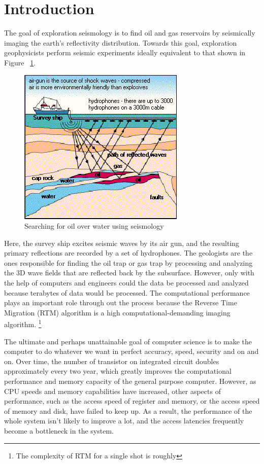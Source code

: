 
\section{Introduction}

The goal of exploration seismology is to find oil and gas reservoirs
by seismically imaging the earth's reflectivity distribution. Towards
this goal, exploration geophysicists perform seismic experiments ideally
equivalent to that shown in Figure ~\ref{fig:oil-drilling}.

\begin{figure}[h]
\centering
\includegraphics[scale=0.65]{img/oil-drilling-prospecting2.jpg}
\caption{Searching for oil over water using seismology}
\label{fig:oil-drilling}
\end{figure}

Here,
the survey ship excites seismic waves by its air gun, and the resulting
primary reflections are recorded by a set of hydrophones. The geologists
are the ones responsible for finding the oil trap or gas trap by processing
and analyzing the 3D wave fields that are reflected back by the subsurface.
However, only with the help of computers and engineers could the data
be processed and analyzed because terabytes of data would be processed.
The computational performance plays an important role through out
the process because the Reverse Time Migration (RTM) algorithm is
a high computational-demanding imaging algorithm.%
\footnote{The complexity of RTM for a single shot is roughly %
}



The ultimate and perhaps unattainable goal of computer science is
to make the computer to do whatever we want in perfect accuracy, speed,
security and on and on. Over time, the number of transistor on integrated
circuit doubles approximately every two year, which greatly improves
the computational performance and memory capacity of the general purpose
computer. However, as CPU speeds and memory capabilities have increased,
other aspects of performance, such as the access speed of register
and memory, or the access speed of memory and disk, have failed to
keep up. As a result, the performance of the whole system isn't likely
to improve a lot, and the access latencies frequently become a bottleneck
in the system.

